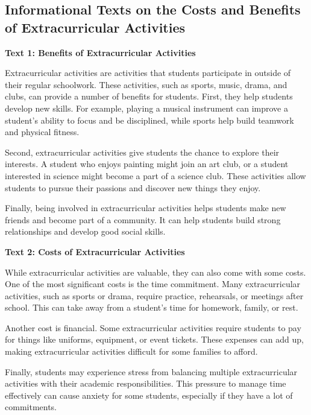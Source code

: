 \documentclass[12pt]{article}
\begin{document}
\onehalfspacing

\subsection*{Informational Texts on the Costs and Benefits of Extracurricular Activities}

\begin{tcolorbox}[colframe=black!40, colback=gray!5]
\begin{spacing}{1.15}

\textbf{Text 1: Benefits of Extracurricular Activities}

Extracurricular activities are activities that students participate in outside of their regular schoolwork. These activities, such as sports, music, drama, and clubs, can provide a number of benefits for students. First, they help students develop new skills. For example, playing a musical instrument can improve a student's ability to focus and be disciplined, while sports help build teamwork and physical fitness.

Second, extracurricular activities give students the chance to explore their interests. A student who enjoys painting might join an art club, or a student interested in science might become a part of a science club. These activities allow students to pursue their passions and discover new things they enjoy.

Finally, being involved in extracurricular activities helps students make new friends and become part of a community. It can help students build strong relationships and develop good social skills.

\textbf{Text 2: Costs of Extracurricular Activities}

While extracurricular activities are valuable, they can also come with some costs. One of the most significant costs is the time commitment. Many extracurricular activities, such as sports or drama, require practice, rehearsals, or meetings after school. This can take away from a student's time for homework, family, or rest.

Another cost is financial. Some extracurricular activities require students to pay for things like uniforms, equipment, or event tickets. These expenses can add up, making extracurricular activities difficult for some families to afford.

Finally, students may experience stress from balancing multiple extracurricular activities with their academic responsibilities. This pressure to manage time effectively can cause anxiety for some students, especially if they have a lot of commitments.

\end{spacing}
\end{tcolorbox}
\end{document}
